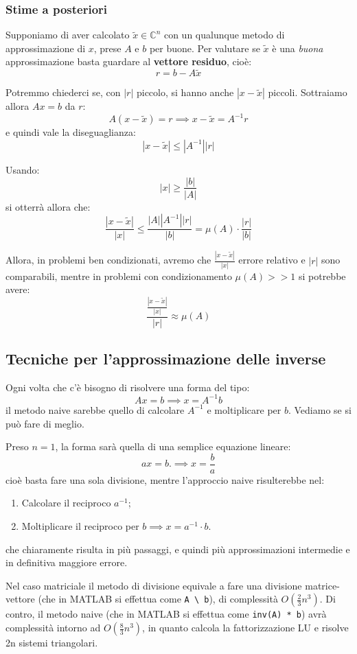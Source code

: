 \documentclass[a4paper,11pt]{article}
\begin{document}
\subsubsection{Stime a posteriori}
Supponiamo di aver calcolato $\tilde{x} \in \mathbb{C}^n$ con un qualunque metodo di approssimazione di $x$, prese $A$ e $b$ per buone.
Per valutare se $\tilde{x}$ è una \textit{buona} approssimazione basta guardare al \textbf{vettore residuo}, cioè:
$$
r = b - A \tilde{x}
$$

Potremmo chiederci se, con $|r|$ piccolo, si hanno anche $|x - \tilde{x}|$ piccoli.
Sottraiamo allora $Ax = b$ da $r$:
$$
A \left( x - \tilde{x} \right) = r \implies x - \tilde{x} = A^{-1} r
$$
e quindi vale la diseguaglianza:
$$
|x - \tilde{x} | \leq |A^{-1}| |r|
$$

Usando:
$$
|x| \geq \frac{|b|}{|A|}
$$
si otterrà allora che:
$$
\frac{|x - \tilde{x}|}{|x|} \leq \frac{ |A| |A^{-1}| |r| }{ |b| } = \mu(A) \cdot \frac{ |r| }{ |b| }
$$

Allora, in problemi ben condizionati, avremo che $\frac{ |x - \tilde{x}| }{|x|}$ errore relativo e $|r|$ sono comparabili, mentre in problemi con condizionamento $\mu(A) >> 1$ si potrebbe avere:
$$
\frac{ \frac{ |x - \tilde{x}| }{|x|} }{ |r| } \approx \mu(A)
$$

\subsection{Tecniche per l'approssimazione delle inverse}
Ogni volta che c'è bisogno di risolvere una forma del tipo:
$$
Ax = b \implies x = A^{-1} b
$$
il metodo naive sarebbe quello di calcolare $A^{-1}$ e moltiplicare per $b$.
Vediamo se si può fare di meglio.

Preso $n = 1$, la forma sarà quella di una semplice equazione lineare:
$$
ax = b. \implies x = \frac{b}{a}
$$
cioè basta fare una sola divisione, mentre l'approccio naive risulterebbe nel:
\begin{enumerate}
	\item Calcolare il reciproco $a^{-1}$;
	\item Moltiplicare il reciproco per $b \implies x = a^{-1} \cdot b$. 
\end{enumerate}
che chiaramente risulta in più passaggi, e quindi più approssimazioni intermedie e in definitiva maggiore errore.

\lstset{language=MATLAB, style=codestyle}

Nel caso matriciale il metodo di divisione equivale a fare una divisione matrice-vettore (che in MATLAB si effettua come \lstinline|A \ b|), di complessità $O( \frac{2}{3} n^3 )$.
Di contro, il metodo naive (che in MATLAB si effettua come \lstinline|inv(A) * b|) avrà complessità intorno ad $O( \frac{8}{3} n^3 )$, in quanto calcola la fattorizzazione LU e risolve 2n sistemi triangolari.
\end{document}
